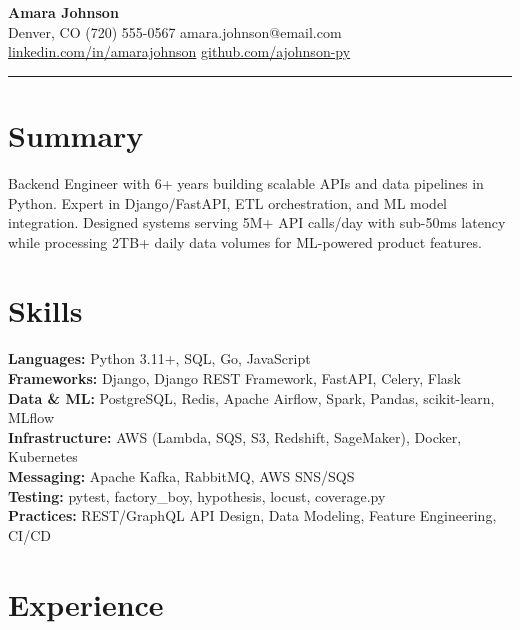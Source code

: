 \documentclass[10pt,a4paper]{article}
\begin{document}
\begin{center}
{\fontsize{20}{24}\selectfont\color{accent}\bfseries Amara Johnson}\\[6pt]
{\small Denver, CO \enspace\textperiodcentered\enspace (720) 555-0567 \enspace\textperiodcentered\enspace amara.johnson@email.com}\\[3pt]
{\small \href{https://linkedin.com/in/amarajohnson}{\color{accent}linkedin.com/in/amarajohnson} \enspace\textperiodcentered\enspace \href{https://github.com/ajohnson-py}{\color{accent}github.com/ajohnson-py}}
\end{center}

\vspace{4pt}
{\color{accent}\rule{\textwidth}{0.8pt}}
\vspace{2pt}

\section{Summary}
Backend Engineer with 6+ years building scalable APIs and data pipelines in Python. Expert in Django/FastAPI, ETL orchestration, and ML model integration. Designed systems serving 5M+ API calls/day with sub-50ms latency while processing 2TB+ daily data volumes for ML-powered product features.

\section{Skills}
\textbf{Languages:} Python 3.11+, SQL, Go, JavaScript\\
\textbf{Frameworks:} Django, Django REST Framework, FastAPI, Celery, Flask\\
\textbf{Data \& ML:} PostgreSQL, Redis, Apache Airflow, Spark, Pandas, scikit-learn, MLflow\\
\textbf{Infrastructure:} AWS (Lambda, SQS, S3, Redshift, SageMaker), Docker, Kubernetes\\
\textbf{Messaging:} Apache Kafka, RabbitMQ, AWS SNS/SQS\\
\textbf{Testing:} pytest, factory\_boy, hypothesis, locust, coverage.py\\
\textbf{Practices:} REST/GraphQL API Design, Data Modeling, Feature Engineering, CI/CD

\section{Experience}
\end{document}

